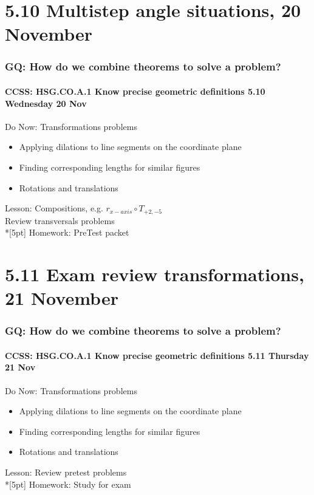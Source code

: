 \documentclass{beamer}
\begin{document}
\section{5.10 Multistep angle situations, 20 November}
\frame
{
  \frametitle{GQ: How do we combine theorems to solve a problem?}
  \framesubtitle{CCSS: HSG.CO.A.1 Know precise geometric definitions \hfill \alert{5.10 Wednesday 20 Nov}}

  \begin{block}{Do Now: Transformations problems}
  \begin{itemize}
    \item Applying dilations to line segments on the coordinate plane
    \item Finding corresponding lengths for similar figures
    \item Rotations and translations
  \end{itemize}
  \end{block}
  Lesson: Compositions, e.g. $r_{x-axis} \circ T_{+2,-5}$\\
  Review transversals problems \\*[5pt]
  Homework: PreTest packet 
}

\section{5.11 Exam review transformations, 21 November}
\frame
{
  \frametitle{GQ: How do we combine theorems to solve a problem?}
  \framesubtitle{CCSS: HSG.CO.A.1 Know precise geometric definitions \hfill \alert{5.11 Thursday 21 Nov}}

  \begin{block}{Do Now: Transformations problems}
  \begin{itemize}
    \item Applying dilations to line segments on the coordinate plane
    \item Finding corresponding lengths for similar figures
    \item Rotations and translations
  \end{itemize}
  \end{block}
  Lesson: Review pretest problems\\*[5pt]
  Homework: Study for exam
}
\end{document}
